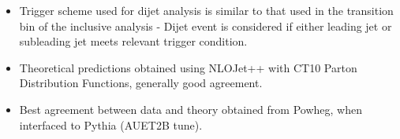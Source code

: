 \documentclass[10pt]{beamer}
\begin{document}
\begin{frame}
\begin{columns}
\end{columns}
\begin{itemize}
\item Trigger scheme used for dijet analysis is similar to that used in the transition bin of the inclusive analysis - Dijet event is considered if either leading jet or subleading jet meets relevant trigger condition.
\item Theoretical predictions obtained using NLOJet++ with CT10 Parton Distribution Functions, generally good agreement.
\item Best agreement between data and theory obtained from Powheg, when interfaced to Pythia (AUET2B tune).
\end{itemize}
\end{frame}

\end{document}
